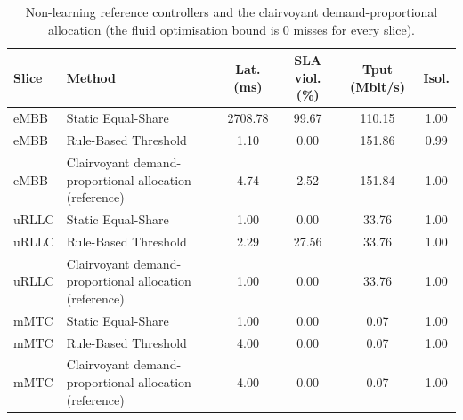 \begin{table}[!t]
\centering
\caption{Non-learning reference controllers and the clairvoyant demand-proportional allocation (the fluid optimisation bound is 0 misses for every slice).}
\label{tab:references}
\footnotesize
\begin{tabular}{llcccc}
\toprule
\textbf{Slice} & \textbf{Method} & \textbf{Lat. (ms)} & \textbf{SLA viol. (\%)} & \textbf{Tput (Mbit/s)} & \textbf{Isol.} \\
\midrule
eMBB & Static Equal-Share & 2708.78 & 99.67 & 110.15 & 1.00 \\
eMBB & Rule-Based Threshold & 1.10 & 0.00 & 151.86 & 0.99 \\
eMBB & Clairvoyant demand-proportional allocation (reference) & 4.74 & 2.52 & 151.84 & 1.00 \\
\midrule
uRLLC & Static Equal-Share & 1.00 & 0.00 & 33.76 & 1.00 \\
uRLLC & Rule-Based Threshold & 2.29 & 27.56 & 33.76 & 1.00 \\
uRLLC & Clairvoyant demand-proportional allocation (reference) & 1.00 & 0.00 & 33.76 & 1.00 \\
\midrule
mMTC & Static Equal-Share & 1.00 & 0.00 & 0.07 & 1.00 \\
mMTC & Rule-Based Threshold & 4.00 & 0.00 & 0.07 & 1.00 \\
mMTC & Clairvoyant demand-proportional allocation (reference) & 4.00 & 0.00 & 0.07 & 1.00 \\
\bottomrule
\end{tabular}
\end{table}